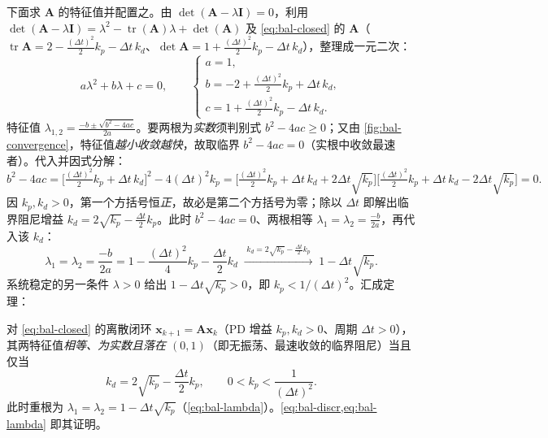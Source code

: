 下面求 $\mathbf{A}$ 的特征值并配置之。由 $\det(\mathbf{A}-\lambda\mathbf{I})=0$，利用 $\det(\mathbf{A}-\lambda\mathbf{I})=\lambda^2-\operatorname{tr}(\mathbf{A})\lambda+\det(\mathbf{A})$ 及 \cref{eq:bal-closed} 的 $\mathbf{A}$（$\operatorname{tr}\mathbf{A}=2-\tfrac{(\Delta t)^2}{2}k_p-\Delta t\,k_d$、$\det\mathbf{A}=1+\tfrac{(\Delta t)^2}{2}k_p-\Delta t\,k_d$），整理成一元二次\cite{unitree2023quadruped}：
\begin{equation}
  a\lambda^2+b\lambda+c=0,\qquad
  \begin{cases}
    a=1,\\[2pt]
    b=-2+\tfrac{(\Delta t)^2}{2}k_p+\Delta t\,k_d,\\[2pt]
    c=1+\tfrac{(\Delta t)^2}{2}k_p-\Delta t\,k_d.
  \end{cases}
  \label{eq:bal-chareq}
\end{equation}
特征值 $\lambda_{1,2}=\tfrac{-b\pm\sqrt{b^2-4ac}}{2a}$。要两根为\emph{实数}须判别式 $b^2-4ac\ge0$；又由 \cref{fig:bal-convergence}，特征值\emph{越小收敛越快}，故取临界 $b^2-4ac=0$（实根中收敛最速者）。代入并因式分解\cite{unitree2023quadruped}：
\begin{equation}
  b^2-4ac=\Big[\tfrac{(\Delta t)^2}{2}k_p+\Delta t\,k_d\Big]^2-4(\Delta t)^2k_p
  =\Big[\tfrac{(\Delta t)^2}{2}k_p+\Delta t\,k_d+2\Delta t\sqrt{k_p}\Big]\Big[\tfrac{(\Delta t)^2}{2}k_p+\Delta t\,k_d-2\Delta t\sqrt{k_p}\Big]=0.
  \label{eq:bal-discr}
\end{equation}
因 $k_p,k_d>0$，第一个方括号恒\emph{正}，故必是第二个方括号为零；除以 $\Delta t$ 即解出临界阻尼增益 $k_d=2\sqrt{k_p}-\tfrac{\Delta t}{2}k_p$。此时 $b^2-4ac=0$、两根相等 $\lambda_1=\lambda_2=\tfrac{-b}{2a}$，再代入该 $k_d$\cite{unitree2023quadruped}：
\begin{equation}
  \lambda_1=\lambda_2=\frac{-b}{2a}=1-\frac{(\Delta t)^2}{4}k_p-\frac{\Delta t}{2}k_d
  \;\xrightarrow{\;k_d=2\sqrt{k_p}-\frac{\Delta t}{2}k_p\;}\;
  1-\Delta t\sqrt{k_p}.
  \label{eq:bal-lambda}
\end{equation}
系统稳定的另一条件 $\lambda>0$ 给出 $1-\Delta t\sqrt{k_p}>0$，即 $k_p<1/(\Delta t)^2$。汇成定理：

\begin{theorem}\label{thm:bal-critical-damp}
对 \cref{eq:bal-closed} 的离散闭环 $\boldsymbol{x}_{k+1}=\mathbf{A}\boldsymbol{x}_k$（PD 增益 $k_p,k_d>0$、周期 $\Delta t>0$），其两特征值\emph{相等、为实数且落在 $(0,1)$}（即无振荡、最速收敛的临界阻尼）当且仅当
\begin{equation}
  k_d=2\sqrt{k_p}-\frac{\Delta t}{2}k_p,
  \qquad
  0<k_p<\frac{1}{(\Delta t)^2}.
  \label{eq:bal-kd}
\end{equation}
此时重根为 $\lambda_1=\lambda_2=1-\Delta t\sqrt{k_p}$（\cref{eq:bal-lambda}）。\cref{eq:bal-discr,eq:bal-lambda} 即其证明。
\end{theorem}


